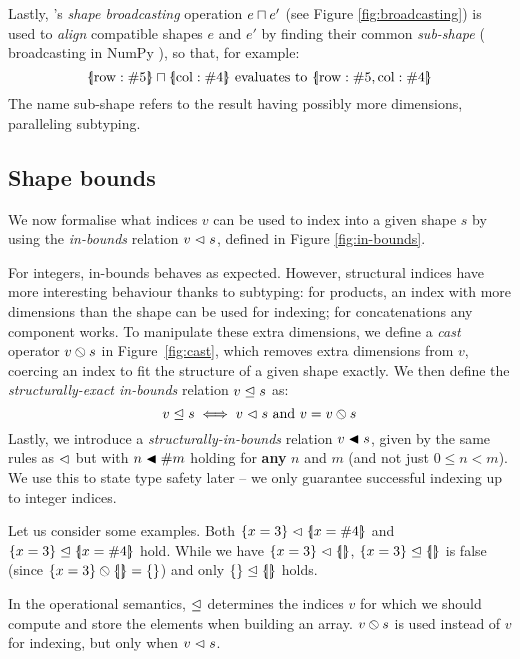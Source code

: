 Lastly, \starr{}'s \textit{shape broadcasting}
operation $e \sqcap e'$ (see Figure \ref{fig:broadcasting}) is used to \textit{align} compatible shapes $e$ and $e'$ by finding their common \emph{sub-shape} (\cf{} broadcasting in NumPy \cite{numpy}), so that, for example:
$$ \sproductval{\mathrm{row}: \ssized 5} \broadcast \sproductval{\mathrm{col}: \ssized 4} \text{ evaluates to } \sproductval{\mathrm{row}: \ssized 5, \mathrm{col}: \ssized 4}$$
The name sub-shape refers to the result having possibly more dimensions, paralleling subtyping.

\subsection{Shape bounds}
\label{subsec:shape-bounds}

We now formalise what indices $v$ can be used to index into a given shape $s$ by using the \emph{in-bounds} relation $v \vartriangleleft s$, defined in Figure \ref{fig:in-bounds}.

For integers, in-bounds behaves as expected. 
However, structural indices have more interesting behaviour thanks to subtyping:
for products, an index with more dimensions than the shape can be used for indexing; for concatenations any component works. 
To manipulate these extra dimensions, we define a \emph{cast} operator ${v} \obslash {s}$ in Figure~\ref{fig:cast}, which removes extra dimensions from $v$, coercing an index to fit the structure of a given shape exactly.
We then define the \emph{structurally-exact in-bounds} relation $v \trianglelefteq s$ as:
$$ v \trianglelefteq s \iff v \vartriangleleft s \text{ and } v = {v} \obslash {s}$$
Lastly, we introduce a \emph{structurally-in-bounds} relation $v \blacktriangleleft s$, given by the same rules as $\vartriangleleft$ but with $n \blacktriangleleft \#{m}$ holding for \textbf{any} $n$ and $m$ (and not just $0 \le n < m$). We use this to state type safety later -- we only guarantee successful indexing up to integer indices.

Let us consider some examples. Both $\srecordval{ x = 3 } \inbs \sproductval{x = \ssize 4}$
and $\srecordval{ x = 3 } \inbsp \sproductval{x = \ssize 4}$ hold.
While we have $\srecordval{x = 3} \inbs \sproductval{}$, $\srecordval{x = 3} \inbsp \sproductval{}$ is false (since $\scast{\srecordval{x = 3}}{\sproductval{}} = \srecordval{}$) and only $\srecordval{} \inbsp \sproductval{}$ holds.

In the operational semantics, $\trianglelefteq$ determines the indices $v$ for which we should compute and store the elements when building an array. ${v} \obslash {s}$ is used instead of $v$ for indexing, but only when $v \vartriangleleft s$.

